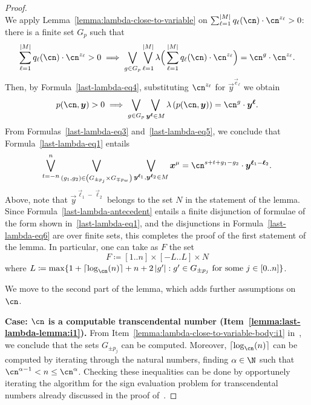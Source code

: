 \begin{proof}
\begin{equation}
    \end{equation}
    We apply Lemma~\ref{lemma:lambda-close-to-variable} on $\sum_{\ell=1}^{\abs{M}} q_{\ell}(\cn) \cdot \cn^{z_\ell} > 0$: there is a finite set $G_p$ such that 
    \begin{equation*}
      \sum_{\ell=1}^{\abs{M}} q_{\ell}(\cn) \cdot \cn^{z_\ell} > 0
      \implies 
      \bigvee_{g \in G_p} \bigvee_{\ell=1}^{\abs{M}}\lambda\Big(\sum_{\ell=1}^{\abs{M}} q_{\ell}(\cn) \cdot \cn^{z_\ell}\Big)=
      \cn^{g} \cdot \cn^{z_\ell}.
    \end{equation*}
    Then, by Formula~\eqref{last-lambda-eq4}, substituting $\cn^{z_\ell}$ for $\vec{y}^{\vec{e}_\ell}$ 
    we obtain 
    \begin{equation}\label{last-lambda-eq5}
      p(\cn, \vec y) > 0 
      \implies \bigvee_{g \in G_p} \bigvee_{\vec y^{\vec \ell} \in M}\lambda\left(p(\cn,\vec y)\right)=
      \cn^{g} \cdot \vec y^{\vec \ell}.
    \end{equation}
    From Formulas~\eqref{last-lambda-eq3} and~\eqref{last-lambda-eq5}, 
    we conclude that Formula~\eqref{last-lambda-eq1} entails
    \begin{equation}\label{last-lambda-eq6}
      \bigvee_{t=-n}^n \bigvee_{(g_1,g_2) \in \left(G_{\pm p_j} \times G_{\mp p_w}\right)} 
      \bigvee_{\vec y^{\vec \ell_1}, \vec y^{\vec \ell_2} \in M}
      \vec x^\mu = \cn^{s+t+g_1-g_2} \cdot \vec y^{\vec \ell_1-\vec \ell_2}.
    \end{equation}
    Above, note that $\vec y^{\vec \ell_1-\vec \ell_2}$ belongs to the set $N$ in the statement of the lemma.
    Since Formula~\eqref{last-lambda-antecedent} entails a finite disjunction of formulae 
    of the form shown in~\eqref{last-lambda-eq1}, 
    and the disjunctions in Formula~\eqref{last-lambda-eq6} are over finite sets, 
    this completes the proof of the first statement of the lemma.
    In particular, one can take as $F$ the set 
    \[ 
      F \coloneqq [1..n] \times [-L..L] \times N
    \]
    where $L \coloneqq \max \{ 1 + \ceil{\log_{\cn}(n)} + n + 2 \abs{g'} : g' \in G_{\pm p_j} \text{ for some } j \in [0..n]\}$.
  
    We move to the second part of the lemma, which adds further assumptions
    on~$\cn$.
  
    \noindent
    \textbf{Case: $\cn$ is a computable transcendental number (Item~\eqref{lemma:last-lambda-lemma:i1}).} 
    From Item~\eqref{lemma:lambda-close-to-variable-body:i1} in~, we conclude that the sets $G_{\pm
    p_j}$ can be computed. Moreover, $\ceil{\log_{\cn}(n)}$ can be computed by
    iterating through the natural numbers, finding $\alpha \in \N$ such that
    $\cn^{\alpha-1} < n \leq \cn^{\alpha}$. Checking these inequalities can be
    done by opportunely iterating the algorithm for the sign evaluation problem for transcendental numbers already 
    discussed in the proof of~.
  

\end{proof}
